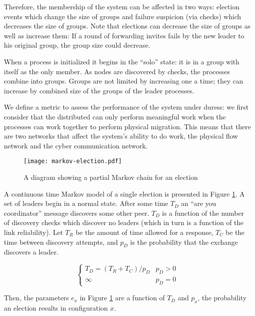 Therefore, the membership of the system can be affected in two ways: election events which change the size of groups and failure suspicion (via checks) which decreases the size of groups. Note that elections can decrease the size of groups as well as increase them: If a round of forwarding invites fails by the new leader to his original group, the group size could decrease.

When a process is initialized it begins in the ``solo'' state: it is in a group with itself as the only member. As nodes are discovered by checks, the processes combine into groups. Groups are not limited by increasing one a time; they can increase by combined size of the groups of the leader processes.

We define a metric to assess the performance of the system under duress: we first consider that the distributed can only perform meaningful work when the processes can work together to perform physical migration. This means that there are two networks that affect the system's ability to do work, the physical flow network and the cyber communication network.

\begin{figure}[!h]
\centering
\texttt{[image: markov-election.pdf]}
\caption{A diagram showing a partial Markov chain for an election}
\label{fig:MARKOVELECTION}
\end{figure}

A continuous time Markov model of a single election is presented in Figure \ref{fig:MARKOVELECTION}.
A set of leaders begin in a normal state. After some time $T_{D}$ an ``are you coordinator'' message discovers some other peer. $T_{D}$ is a function of the number of discovery checks which discover no leaders (which in turn is a function of the link reliability). Let $T_{R}$ be the amount of time allowed for a response, $T_{C}$ be the time between discovery attempts, and $p_{D}$ is the probability that the exchange discovers a leader.

\begin{equation}
\begin{cases}
T_{D} = ( T_{R}+T_{C} ) / p_{D} & p_{D} > 0 \\
\infty & p_{D} = 0
\end{cases}
\end{equation}

Then, the parameters $e_x$ in Figure \ref{fig:MARKOVELECTION} are a function of $T_{D}$ and $p_{x}$, the probability an election results in configuration $x$.

